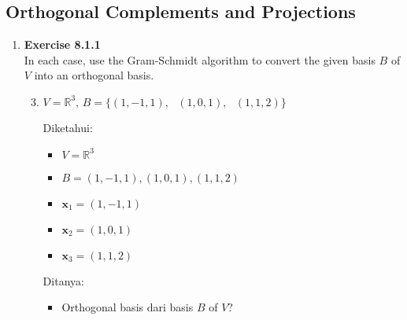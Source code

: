 \documentclass[12pt, a4paper]{scrartcl}
\begin{document}
    \subsection*{Orthogonal Complements and Projections}
        \begin{enumerate}
            \item \textbf{Exercise 8.1.1}\\In each case, use the Gram-Schmidt algorithm to convert the given basis $B$ of $V$ into an orthogonal basis.
            \begin{enumerate}
                \setcounter{enumii}{2}
                \item $V = \mathbb{R}^3 \mbox{, } B = \{(1, -1, 1), \mbox{ }(1, 0, 1), \mbox{ }(1, 1, 2)\}$
                
                Diketahui:
                \begin{itemize}
                    \item[] $V=\mathbb{R}^3$
                    \item[] $B={(1, -1, 1), (1, 0, 1), (1, 1, 2)}$
                    \item[] $\textbf{x}_1=(1, -1, 1)$
                    \item[] $\textbf{x}_2=(1, 0, 1)$
                    \item[] $\textbf{x}_3=(1, 1, 2)$
                \end{itemize}

                Ditanya:
                \begin{itemize}
                    \item Orthogonal basis dari basis $B$ of $V$?
                \end{itemize}
            

\end{enumerate}
\end{enumerate}
\end{document}
